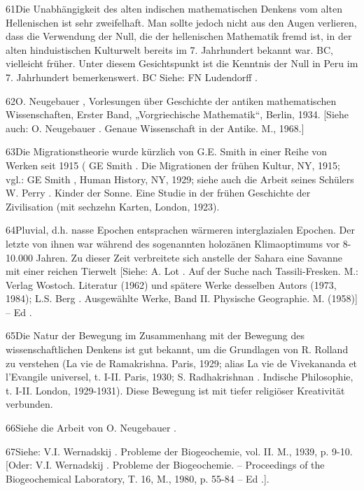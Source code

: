 \documentclass[11pt,a4paper]{book}
\begin{document}
61Die Unabhängigkeit des alten indischen mathematischen Denkens vom alten Hellenischen ist sehr zweifelhaft. Man sollte jedoch nicht aus den Augen verlieren, dass die Verwendung der Null, die der hellenischen Mathematik fremd ist, in der alten hinduistischen Kulturwelt bereits im 7. Jahrhundert bekannt war. BC, vielleicht früher. Unter diesem Gesichtspunkt ist die Kenntnis der Null in Peru im 7. Jahrhundert bemerkenswert. BC Siehe: FN Ludendorff .



62O. Neugebauer , Vorlesungen über Geschichte der antiken mathematischen Wissenschaften, Erster Band, „Vorgriechische Mathematik“, Berlin, 1934. [Siehe auch: O. Neugebauer . Genaue Wissenschaft in der Antike. M., 1968.]



63Die Migrationstheorie wurde kürzlich von G.E. Smith in einer Reihe von Werken seit 1915 ( GE Smith . Die Migrationen der frühen Kultur, NY, 1915; vgl.: GE Smith , Human History, NY, 1929; siehe auch die Arbeit seines Schülers W. Perry . Kinder der Sonne. Eine Studie in der frühen Geschichte der Zivilisation (mit sechzehn Karten, London, 1923).



64Pluvial, d.h. nasse Epochen entsprachen wärmeren interglazialen Epochen. Der letzte von ihnen war während des sogenannten holozänen Klimaoptimums vor 8-10.000 Jahren. Zu dieser Zeit verbreitete sich anstelle der Sahara eine Savanne mit einer reichen Tierwelt [Siehe: A. Lot . Auf der Suche nach Tassili-Fresken. M.: Verlag Wostoch. Literatur (1962) und spätere Werke desselben Autors (1973, 1984); L.S. Berg . Ausgewählte Werke, Band II. Physische Geographie. M. (1958)] -- Ed .



65Die Natur der Bewegung im Zusammenhang mit der Bewegung des wissenschaftlichen Denkens ist gut bekannt, um die Grundlagen von R. Rolland zu verstehen (La vie de Ramakrishna. Paris, 1929; alias La vie de Vivekananda et l'Evangile universel, t. I-II. Paris, 1930; S. Radhakrishnan . Indische Philosophie, t. I-II. London, 1929-1931). Diese Bewegung ist mit tiefer religiöser Kreativität verbunden.



66Siehe die Arbeit von O. Neugebauer .



67Siehe: V.I. Wernadskij . Probleme der Biogeochemie, vol. II. M., 1939, p. 9-10. [Oder: V.I. Wernadskij . Probleme der Biogeochemie. -- Proceedings of the Biogeochemical Laboratory, T. 16, M., 1980, p. 55-84 -- Ed .].
\end{document}

